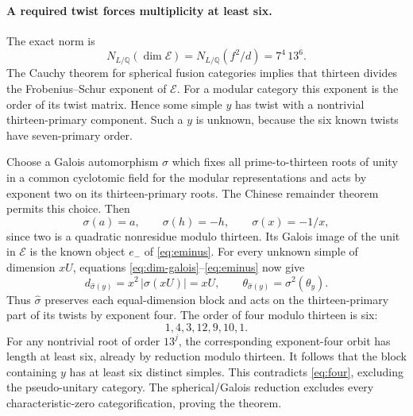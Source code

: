 \documentclass[11pt]{article}
\newcommand{\E}{\mathcal E}
\begin{document}
\paragraph{A required twist forces multiplicity at least six.}
The exact norm is
\[
 N_{L/\mathbb Q}(\dim\E)=N_{L/\mathbb Q}(f^2/d)=7^4\,13^6.
\]
The Cauchy theorem for spherical fusion categories
\cite[Theorem 3.9]{BNRW} implies that thirteen divides the
Frobenius--Schur exponent of $\E$. For a modular category this exponent
is the order of its twist matrix. Hence some simple $y$ has twist with a
nontrivial thirteen-primary component. Such a $y$ is unknown, because the
six known twists have seven-primary order.

Choose a Galois automorphism $\sigma$ which fixes all prime-to-thirteen
roots of unity in a common cyclotomic field for the modular representations
and acts by exponent two on its thirteen-primary roots. The Chinese
remainder theorem permits this choice. Then
\[
 \sigma(a)=a,\qquad \sigma(h)=-h,\qquad\sigma(x)=-1/x,
\]
since two is a quadratic nonresidue modulo thirteen. Its Galois image of
the unit in $\E$ is the known object $e_-$ of \eqref{eq:eminus}.
For every unknown simple of dimension $xU$, equations
\eqref{eq:dim-galois}--\eqref{eq:eminus} now give
\[
 d_{\widehat\sigma(y)}=x^2\,|\sigma(xU)|=xU,
 \qquad
 \theta_{\widehat\sigma(y)}=\sigma^2(\theta_y).
\]
Thus $\widehat\sigma$ preserves each equal-dimension block and acts on
the thirteen-primary part of its twists by exponent four. The order of
four modulo thirteen is six:
\[
 1,4,3,12,9,10,1.
\]
For any nontrivial root of order $13^j$, the corresponding exponent-four
orbit has length at least six, already by reduction modulo thirteen.
It follows that the block containing $y$ has at least six distinct simples.
This contradicts \eqref{eq:four}, excluding the pseudo-unitary category.
The spherical/Galois reduction excludes every characteristic-zero
categorification, proving the theorem.
\end{document}
